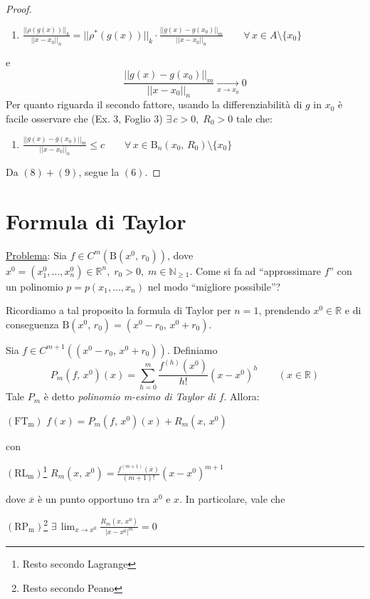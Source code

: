 \begin{proof}
\begin{enumerate}[labelindent=\parindent,leftmargin=*,label=\textnormal{(\arabic*)},start=8]
\item $\displaystyle \frac{||\rho(g(x))||_k}{||x-x_0||_n} =
||\rho^*(g(x))||_k \cdot \frac{||g(x)-g(x_0)||_m}{||x-x_0||_n} \qquad \forall \, x \in A \setminus \lbrace x_0 \rbrace
$
\end{enumerate}
e $$ \frac{||g(x)-g(x_0)||_m}{||x-x_0||_n} \underset{x \rightarrow x_0}{\longrightarrow} 0$$
Per quanto riguarda il secondo fattore, usando la differenziabilità di $g$ in $x_0$ è facile osservare che (Ex. 3, Foglio 3) $\exists \, c > 0, \; R_0 > 0$ tale che:
\begin{enumerate}[labelindent=\parindent,leftmargin=*,label=\textnormal{(\arabic*)},start=8]
\item $\displaystyle \frac{||g(x)-g(x_0)||_m}{||x-x_0||_n} \leq c \qquad \forall \, x \in \mathrm{B}_n (x_0,\,R_0) \setminus \lbrace x_0 \rbrace$
\end{enumerate}
Da $(8)+(9)$, segue la $(6)$.
\end{proof}



\section{Formula di Taylor}
\underline{Problema}: Sia $f \in C^m(\mathrm{B}(x^0,\,r_0))$, dove $x^0=(x^0_1,\ldots,x^0_n) \in \mathbb{R}^n, \; r_0 > 0, \; m \in \mathbb{N}_{\geq 1}$.
Come si fa ad ``approssimare $f$'' con un polinomio $p=p(x_1,\ldots,x_n)$ nel modo ``migliore possibile''?

Ricordiamo a tal proposito la formula di Taylor per $n=1$, prendendo $x^0 \in \mathbb{R}$ e di conseguenza $\mathrm{B}(x^0,\,r_0)=(x^0-r_0,\,x^0+r_0)$.

\begin{thm}[Formula di Taylor con resto secondo Lagrange ($n=1$)]
Sia $f \in C^{m+1}((x^0-r_0,\,x^0+r_0))$. Definiamo
$$
P_m(f,\,x^0)(x) = \sum_{h=0}^{m} \frac{f^{(h)}(x^0)}{h!}(x-x^0)^h
\qquad (x \in \mathbb{R})
$$
Tale $P_m$ è detto \emph{polinomio m-esimo di Taylor di $f$}. Allora:
\begin{center}
$\mathrm{(FT_m)}$
\hfill
$\displaystyle f(x) = P_m(f,\,x^0)(x)+R_m(x,\,x^0)$
\hfill \null \\
\end{center}
con
\begin{center}
$\mathrm{(RL_m)}$\footnote{Resto secondo Lagrange}
\hfill
$\displaystyle R_m(x,\,x^0) = \frac{f^{(m+1)}(\overline{x})}{(m+1)!}(x-x^0)^{m+1}$
\hfill \null \\
\end{center}
dove $\overline{x}$ è un punto opportuno tra $x^0$ e $x$. In particolare, vale che
\begin{center}
$\mathrm{(RP_m)}$\footnote{Resto secondo Peano}
\hfill
$\displaystyle \exists \, \lim_{x \rightarrow x^0} \frac{R_m(x,\,x^0)}{|x-x^0|^m} = 0$
\hfill \null \\
\end{center}
\end{thm}

